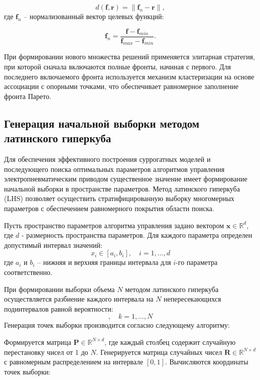 \begin{equation*}
d(\mathbf{f}, \mathbf{r}) = \|\mathbf{f}_n - \mathbf{r}\|,
\end{equation*}
где $\mathbf{f}_n$ -- нормализованный вектор целевых функций:

\begin{equation*}
\mathbf{f}_n = \frac{\mathbf{f} - \mathbf{f}_{min}}{\mathbf{f}_{max} - \mathbf{f}_{min}}.
\end{equation*}

При формировании нового множества решений применяется элитарная стратегия, при которой сначала включаются полные
фронты, начиная с первого. Для последнего включаемого фронта используется механизм
кластеризации на основе ассоциации с опорными точками, что обеспечивает равномерное заполнение фронта Парето.

\subsection{Генерация начальной выборки методом латинского гиперкуба}\label{sec:ch4/sec4/subsec1}
Для обеспечения эффективного построения суррогатных моделей и последующего поиска
оптимальных параметров алгоритмов управления электропневматическим приводом существенное
значение имеет формирование начальной выборки в пространстве параметров.
Метод латинского гиперкуба (LHS) позволяет осуществить стратифицированную выборку
многомерных параметров с обеспечением равномерного покрытия области поиска.

Пусть пространство параметров алгоритма управления задано
вектором $\mathbf{x} \in \mathbb{R}^d$, где $d$ - размерность пространства параметров.
Для каждого параметра определен допустимый интервал значений:
\begin{equation*}
x_i \in [a_i, b_i], \quad i = 1,\ldots,d
\end{equation*}
где $a_i$ и $b_i$ -- нижняя и верхняя границы интервала для $i$-го параметра соответственно.

При формировании выборки объема $N$ методом латинского гиперкуба
осуществляется разбиение каждого интервала
на $N$ непересекающихся подинтервалов равной вероятности:
\begin{equation*}
[a_i + \frac{k-1}{N}(b_i - a_i), a_i + \frac{k}{N}(b_i - a_i)], \quad k = 1,\ldots,N
\end{equation*}
Генерация точек выборки производится согласно следующему алгоритму:

Формируется матрица $\mathbf{P} \in \mathbb{R}^{N \times d}$, где каждый столбец содержит случайную перестановку чисел от 1 до $N$.
Генерируется матрица случайных чисел $\mathbf{R} \in \mathbb{R}^{N \times d}$ с равномерным распределением на интервале $[0,1]$.
Вычисляются координаты точек выборки:

